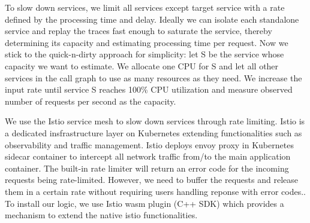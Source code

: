 
 To slow down services, we limit all services except target service with a rate defined by the processing time and delay.
Ideally we can isolate each standalone service and replay the traces fast enough to saturate the service, thereby determining its capacity and 
estimating processing time per request. Now we stick to the quick-n-dirty approach for simplicity: let S be the service 
whose capacity we want to estimate. We allocate one CPU for S and let all other services in the call graph to use as many resources as they need. We increase 
the input rate until service S reaches 100\% CPU utilization and measure observed number of requests per second as the capacity.

We use the Istio service mesh \cite{istio} to slow down services through rate limiting.
Istio is a dedicated insfrastructure layer on Kubernetes extending functionalities such as observability and traffic management.
Istio deploys envoy proxy in Kubernetes sidecar container to intercept all network traffic from/to the main application container.
The built-in rate limiter will return an error code for the incoming requests being rate-limited. However, we need to buffer the requests
and release them in a certain rate without requiring users handling reponse with error codes..
To install our logic, we use Istio wasm plugin (C++ SDK) which provides a mechanism to extend the native istio functionalities. 


